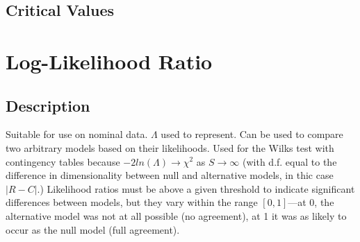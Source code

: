 \documentclass[11pt]{article}
\begin{document}
\subsection{Critical Values}
















\section{Log-Likelihood Ratio}
\label{section:loglikelihood}
\subsection{Description}
Suitable for use on nominal data.  
$\Lambda$ used to represent.  
Can be used to compare two arbitrary models based on their likelihoods.  
Used for the Wilks test with contingency tables because $-2ln(\Lambda) \to \chi^2$ as $S \to \infty$ (with d.f. equal to the difference in dimensionality between null and alternative models, in thic case $|R-C|$.)  
Likelihood ratios must be above a given threshold to indicate significant differences between models, but they vary within the range $[0, 1]$---at 0, the alternative model was not at all possible (no agreement), at 1 it was as likely to occur as the null model (full agreement).

\end{document}
